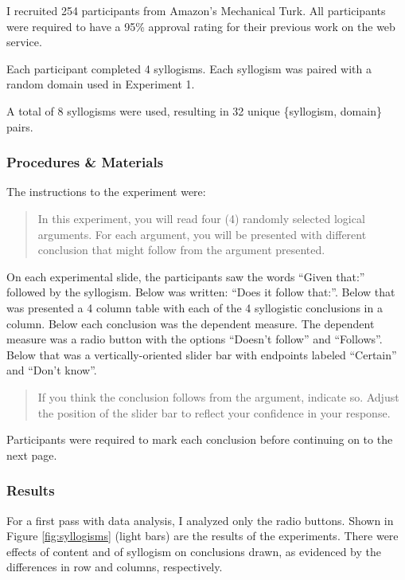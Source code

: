 \documentclass{llncs} %
\begin{document}
I recruited 254 participants from Amazon's Mechanical Turk. All participants were required to have a 95\% approval rating for their previous work on the web service. 

Each participant completed 4 syllogisms. Each syllogism was paired with a random domain used in Experiment 1.

A total of 8 syllogisms were used, resulting in 32 unique \{syllogism, domain\} pairs.

\subsubsection{Procedures \& Materials}

The instructions to the experiment were:

\begin{quotation}
In this experiment, you will read four (4) randomly selected logical arguments. For each argument, you will be presented with different conclusion that might follow from the argument presented.
\end{quotation}

On each experimental slide, the participants saw the words ``Given that:'' followed by the syllogism. Below was written: ``Does it follow that:''. Below that was presented a 4 column table with each of the 4 syllogistic conclusions in a column. Below each conclusion was the dependent measure. The dependent measure was a radio button with the options ``Doesn't follow'' and ``Follows''. Below that was a vertically-oriented slider bar with endpoints labeled ``Certain'' and ``Don't know''. 

\begin{quotation}
If you think the conclusion follows from the argument, indicate so. Adjust the position of the slider bar to reflect your confidence in your response.
\end{quotation}

Participants were required to mark each conclusion before continuing on to the next page.

\subsubsection{Results}

For a first pass with data analysis, I analyzed only the radio buttons. Shown in Figure \ref{fig:syllogisms} (light bars) are the results of the experiments. There were effects of content and of syllogism on conclusions drawn, as evidenced by the differences in row and columns, respectively.
\end{document}
